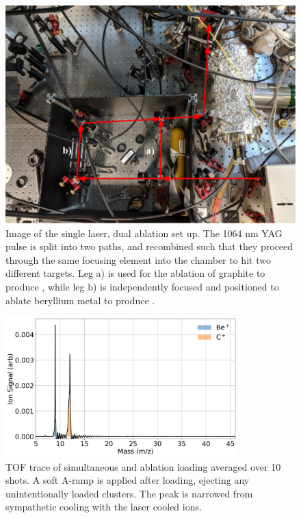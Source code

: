 \begin{figure}[H]
	\centering
	\includegraphics[width=\textwidth]{images/ablation_optics.png}
	\caption{Image of the single laser, dual ablation set up. The 1064 nm YAG pulse is split into two paths, and recombined such that they proceed through the same focusing element into the chamber to hit two different targets. Leg a) is used for the ablation of graphite to produce , while leg b) is independently focused and positioned to ablate beryllium metal to produce .}
	\label{fig: dual ablation}
\end{figure}

\begin{figure}[H]
	\centering
	\includegraphics[width=0.8\textwidth]{images/Be_C_TOF.png}
	\caption{TOF trace of simultaneous  and  ablation loading averaged over 10 shots. A soft A-ramp is applied after loading, ejecting any unintentionally loaded  clusters. The  peak is narrowed from sympathetic cooling with the laser cooled  ions.}
	\label{fig: Be C TOF}
\end{figure}

